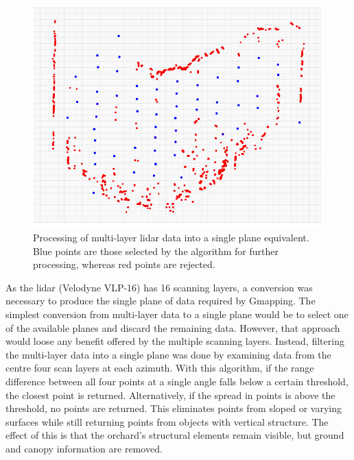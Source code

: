 \documentclass[preprint,authoryear,12pt]{elsarticle}
\begin{document}
        \begin{figure}[htb]
            \centering
            \includegraphics[width=\linewidth]{imgs/single_plane_extraction/single_plane_extraction.pdf}
            \caption{
                Processing of multi-layer lidar data into a single plane equivalent.
                Blue points are those selected by the algorithm for further processing, whereas red points are rejected.
            }
            \label{fig:singlePlaneExtraction}
        \end{figure}

        As the lidar (Velodyne VLP-16) has 16 scanning layers, a conversion was necessary to produce the single plane of data required by Gmapping.
        The simplest conversion from multi-layer data to a single plane would be to select one of the available planes and discard the remaining data.
        However, that approach would loose any benefit offered by the multiple scanning layers.
        Instead, filtering the multi-layer data into a single plane was done by examining data from the centre four scan layers at each azimuth.
        With this algorithm, if the range difference between all four points at a single angle falls below a certain threshold, the closest point is returned.
        Alternatively, if the spread in points is above the threshold, no points are returned.
        This eliminates points from sloped or varying surfaces while still returning points from objects with vertical structure.
        The effect of this is that the orchard's structural elements remain visible, but ground and canopy information are removed.
\end{document}
